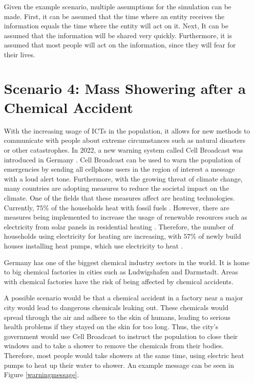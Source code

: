Given the example scenario, multiple assumptions for the simulation can
be made. First, it can be assumed that the time where an entity receives
the information equals the time where the entity will act on it.
Next, It can be assumed that the information will be shared very quickly.
Furthermore, it is assumed that most people will act on the information,
since they will fear for their lives.


\section{Scenario 4: Mass Showering after a Chemical Accident}

With the increasing usage of ICTs in the population, it allows for 
new methods to communicate with people about extreme circumstances
such as natural disasters or other catastrophes. In 2022,
a new warning system called Cell Broadcast was introduced in Germany
\cite{techrichtlinie}. Cell Broadcast can be used to warn the population
of emergencies by sending all cellphone users in the 
region of interest a message with a loud alert tone.
Furthermore, with the growing threat of climate change, many countries
are adopting measures to reduce the societal impact on the
climate. One of the fields that these measures affect 
are heating technologies. Currently, $75\%$ of the households 
heat with fossil fuels \cite{bdewhouhseholds}. 
However, there are measures being 
implemented to increase the usage of renewable resources such 
as electricity from solar panels in residential heating
\cite{heizungsgesetz}. Therefore, the number of households 
using electricity for heating are increasing, with 
$57\%$ of newly build houses installing 
heat pumps, which use electricity to heat
\cite{heatingpumps}.

Germany has one of the biggest chemical industry sectors in the world.
It is home to big chemical factories in cities such as Ludwigshafen and
Darmstadt. Areas with chemical factories have the risk of being
affected by chemical accidents.

A possible scenario would be that a chemical accident in a 
factory near a major city would lead to dangerous chemicals 
leaking out. These chemicals would spread through the air 
and adhere to the skin of humans, leading to serious 
health problems if they stayed on the skin for too long.
Thus, the city's government would use Cell Broadcast to
instruct the population to close their windows and 
to take a shower to remove the chemicals from their bodies.
Therefore, most people would take showers at the same time,
using electric heat pumps to heat up their water to shower.
An example message can be seen in Figure \ref{warningmessage}.

